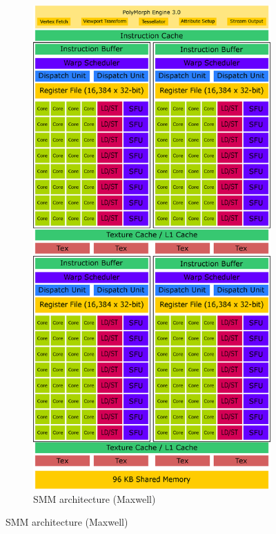\begin{figure}[p]
\begin{subfigure}{0.49\textwidth}
  \includegraphics[width=1\linewidth]{img/SMMArchitecture.eps}
  \caption{SMM architecture (Maxwell)}
  \label{fig:smmarchitecture}
\end{subfigure}
\vspace*{0.1cm} 

\end{figure}
